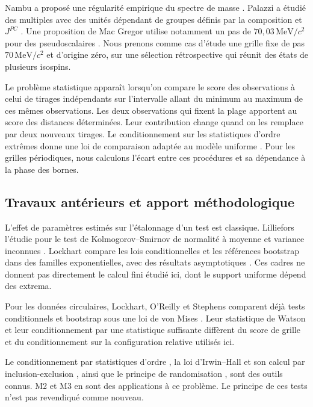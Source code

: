 \documentclass[11pt,a4paper]{article}
\newcommand{\unit}{\,\mathrm{MeV}/c^{2}}
\begin{document}
Nambu a proposé une régularité empirique du spectre de masse \cite{nambu}. Palazzi a étudié des multiples avec des unités dépendant de groupes définis par la composition et $J^{PC}$ \cite{palazzi}. Une proposition de Mac Gregor utilise notamment un pas de $70{,}03\unit$ pour des pseudoscalaires \cite{macgregor}. Nous prenons comme cas d'étude une grille fixe de pas $70\unit$ et d'origine zéro, sur une sélection rétrospective qui réunit des états de plusieurs isospins.

Le problème statistique apparaît lorsqu'on compare le score des observations à celui de tirages indépendants sur l'intervalle allant du minimum au maximum de ces mêmes observations. Les deux observations qui fixent la plage apportent au score des distances déterminées. Leur contribution change quand on les remplace par deux nouveaux tirages. Le conditionnement sur les statistiques d'ordre extrêmes donne une loi de comparaison adaptée au modèle uniforme \cite{order}. Pour les grilles périodiques, nous calculons l'écart entre ces procédures et sa dépendance à la phase des bornes.

\subsection{Travaux antérieurs et apport méthodologique}\label{sec:prior}

L'effet de paramètres estimés sur l'étalonnage d'un test est classique. Lilliefors l'étudie pour le test de Kolmogorov--Smirnov de normalité à moyenne et variance inconnues \cite{lilliefors}. Lockhart compare les lois conditionnelles et les références bootstrap dans des familles exponentielles, avec des résultats asymptotiques \cite{lockhart}. Ces cadres ne donnent pas directement le calcul fini étudié ici, dont le support uniforme dépend des extrema.

Pour les données circulaires, Lockhart, O'Reilly et Stephens comparent déjà tests conditionnels et bootstrap sous une loi de von Mises \cite{vonmises}. Leur statistique de Watson et leur conditionnement par une statistique suffisante diffèrent du score de grille et du conditionnement sur la configuration relative utilisés ici.

Le conditionnement par statistiques d'ordre \cite{order}, la loi d'Irwin--Hall et son calcul par inclusion-exclusion \cite{irwinhall}, ainsi que le principe de randomisation \cite{hemerik}, sont des outils connus. M2 et M3 en sont des applications à ce problème. Le principe de ces tests n'est pas revendiqué comme nouveau.
\end{document}
